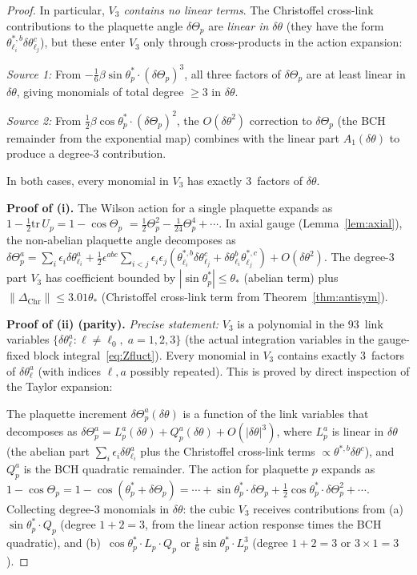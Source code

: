 \documentclass[11pt]{article}
\theoremstyle{definition}
\newcommand{\tr}{\mathrm{tr}}
\begin{document}
\begin{proof}
In particular, \emph{$V_3$ contains no linear terms}.
The Christoffel cross-link contributions to the plaquette angle
$\delta\Theta_p$ are \emph{linear in $\delta\theta$}
(they have the form $\theta^{*,b}_{\ell_i}\delta\theta^c_{\ell_j}$),
but these enter $V_3$ only through cross-products in the action
expansion:

\emph{Source 1:} From
$-\tfrac{1}{6}\beta\sin\theta_p^*\cdot(\delta\Theta_p)^3$,
all three factors of $\delta\Theta_p$ are at least linear in
$\delta\theta$, giving monomials of total degree $\ge 3$ in
$\delta\theta$.

\emph{Source 2:} From
$\tfrac{1}{2}\beta\cos\theta_p^*\cdot(\delta\Theta_p)^2$,
the $O(\delta\theta^2)$ correction to
$\delta\Theta_p$ (the BCH remainder from the exponential map)
combines with the linear part $A_1(\delta\theta)$ to produce
a degree-3 contribution.

In both cases, every monomial in $V_3$ has exactly 3~factors of
$\delta\theta$.

\textbf{Proof of (i).}
The Wilson action for a single plaquette expands as
$1-\frac{1}{2}\tr\,U_p=1-\cos\Theta_p$
$=\frac{1}{2}\Theta_p^2-\frac{1}{24}\Theta_p^4+\cdots$.
In axial gauge (Lemma~\ref{lem:axial}), the non-abelian plaquette
angle decomposes as
$\delta\Theta_p^a=\sum_i\epsilon_i\delta\theta_{\ell_i}^a
+\frac{1}{2}\epsilon^{abc}\sum_{i<j}\epsilon_i\epsilon_j
(\theta_{\ell_i}^{*,b}\delta\theta_{\ell_j}^c
+\delta\theta_{\ell_i}^b\theta_{\ell_j}^{*,c})
+O(\delta\theta^2)$.
The degree-3 part $V_3$ has coefficient bounded by
$|\sin\theta_p^*|\le\theta_*$ (abelian term) plus
$\|\Delta_{\mathrm{Chr}}\|\le 3.01\theta_*$ (Christoffel cross-link
term from Theorem~\ref{thm:antisym}).

\textbf{Proof of (ii) (parity).}
\emph{Precise statement:} $V_3$ is a polynomial in the
93~link variables
$\{\delta\theta_\ell^a:\ell\ne\ell_0,\;a=1,2,3\}$ (the
actual integration variables in the gauge-fixed block
integral~\eqref{eq:Zfluct}).  Every monomial in $V_3$
contains exactly 3~factors of $\delta\theta_\ell^a$ (with
indices $\ell,a$ possibly repeated).  This is proved
by direct inspection of the Taylor expansion:

The plaquette increment
$\delta\Theta_p^a(\delta\theta)$ is a function of the link
variables that decomposes as
$\delta\Theta_p^a=L_p^a(\delta\theta)+Q_p^a(\delta\theta)
+O(|\delta\theta|^3)$,
where $L_p^a$ is linear in $\delta\theta$ (the abelian part
$\sum_i\epsilon_i\delta\theta_{\ell_i}^a$ plus the
Christoffel cross-link terms
$\propto\theta^{*,b}\delta\theta^c$), and $Q_p^a$ is the
BCH quadratic remainder.  The action for plaquette $p$ expands as
$1-\cos\Theta_p=1-\cos(\theta_p^*+\delta\Theta_p)
=\cdots+\sin\theta_p^*\cdot\delta\Theta_p
+\frac{1}{2}\cos\theta_p^*\cdot\delta\Theta_p^2+\cdots$.
Collecting degree-3 monomials in $\delta\theta$:
the cubic $V_3$ receives contributions from
(a)~$\sin\theta_p^*\cdot Q_p$ (degree $1+2=3$, from the
linear action response times the BCH quadratic), and
(b)~$\cos\theta_p^*\cdot L_p\cdot Q_p$ or
$\frac{1}{6}\sin\theta_p^*\cdot L_p^3$ (degree $1+2=3$ or
$3\times 1=3$).


\end{proof}
\end{document}
